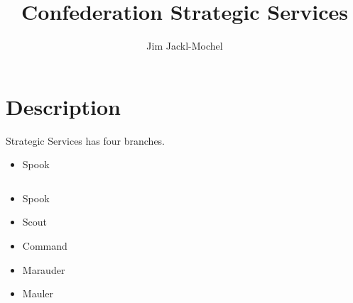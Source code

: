 
\title{Confederation Strategic Services}
\author{Jim Jackl-Mochel}
\maketitle
\section{Description}

Strategic Services has four branches.

\begin{itemize}
	\item Spook
\end{itemize}

\begin{verbatim}
\end{verbatim}

\begin{itemize}
	\item Spook
	\item Scout
	\item Command
	\item Marauder
	\item Mauler
\end{itemize}


